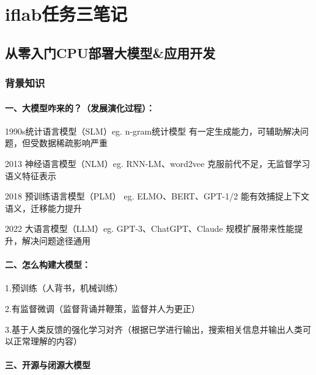 \documentclass[
]{article}
\author{}
\date{}
\begin{document}
\section{\texorpdfstring{\textbf{iflab任务三笔记}}{iflab任务三笔记}}\label{iflabux4efbux52a1ux4e09ux7b14ux8bb0}

\subsection{从零入门CPU部署大模型\&应用开发}\label{ux4eceux96f6ux5165ux95e8cpuux90e8ux7f72ux5927ux6a21ux578bux5e94ux7528ux5f00ux53d1}

\subsubsection{背景知识}\label{ux80ccux666fux77e5ux8bc6}

\paragraph{一、大模型咋来的？（发展演化过程）：}\label{ux4e00ux5927ux6a21ux578bux548bux6765ux7684ux53d1ux5c55ux6f14ux5316ux8fc7ux7a0b}

1990s统计语言模型（SLM）eg. n-gram统计模型
有一定生成能力，可辅助解决问题，但受数据稀疏影响严重

2013 神经语言模型（NLM）eg. RNN-LM、word2vee
克服前代不足，无监督学习语义特征表示

2018 预训练语言模型（PLM） eg. ELMO、BERT、GPT-1/2
能有效捕捉上下文语义，迁移能力提升

2022 大语言模型（LLM）eg. GPT-3、ChatGPT、Claude
规模扩展带来性能提升，解决问题途径通用

\paragraph{二、怎么构建大模型：}\label{ux4e8cux600eux4e48ux6784ux5efaux5927ux6a21ux578b}

1.预训练（人背书，机械训练）

2.有监督微调（监督背诵并鞭策，监督并人为更正）

3.基于人类反馈的强化学习对齐（根据已学进行输出，搜索相关信息并输出人类可以正常理解的内容）

\paragraph{三、开源与闭源大模型}\label{ux4e09ux5f00ux6e90ux4e0eux95edux6e90ux5927ux6a21ux578b}
\end{document}
